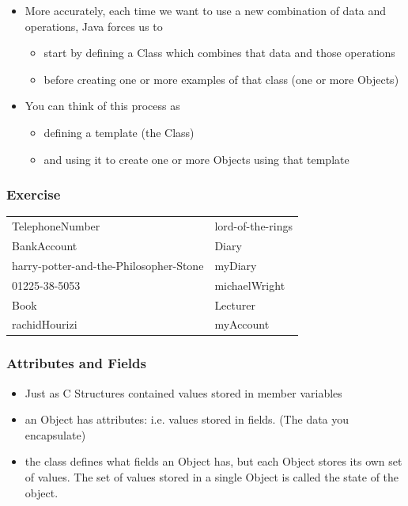 \documentclass{beamer}
\begin{document}
\begin{frame}\begin{itemize}
\item More accurately, each time we want to use a new combination of data
and operations, Java forces us to 

\begin{itemize}
\item start by defining a Class which combines that data and those operations
\item before creating one or more examples of that class (one or more Objects)
\end{itemize}
\item You can think of this process as 

\begin{itemize}
\item defining a template (the Class)
\item and using it to create one or more Objects using that template
\end{itemize}
\end{itemize}\end{frame}

\begin{frame}
\frametitle{Exercise}
\begin{tabular}{ll}
TelephoneNumber & lord-of-the-rings \\
BankAccount & Diary\\
harry-potter-and-the-Philosopher-Stone  & myDiary\\
01225-38-5053 & michaelWright\\
Book & Lecturer\\
rachidHourizi & myAccount\\
\end{tabular}
\end{frame}

\begin{frame}
\frametitle{Attributes and Fields}
\begin{itemize}
\item Just as C Structures contained values stored in member variables
\item an Object has \alert{attributes}: i.e. \alert{values} stored in \alert{fields}. (The data you encapsulate)
\item the class defines what fields an Object has, but each Object stores its own set of values.
The set of values stored in a single Object is called the \alert{state} of the object.
\end{itemize}
\end{frame}
\end{document}
